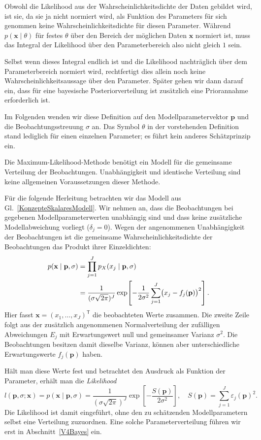 Obwohl die Likelihood aus der Wahrscheinlichkeitsdichte der Daten
gebildet wird, ist sie, da sie ja nicht normiert wird,
als Funktion des Parameters für sich genommen
keine Wahrscheinlichkeitsdichte für diesen Parameter. Während
$p(\mathbf x\mid\theta)$ für festes $\theta$ über den Bereich der
möglichen Daten $\mathbf x$ normiert ist, muss das Integral der
Likelihood über den Parameterbereich also nicht gleich $1$ sein.

Selbst wenn dieses Integral endlich ist und die Likelihood
nachträglich über dem Parameterbereich normiert wird, rechtfertigt
dies allein noch keine Wahrscheinlichkeitsaussage über den
Parameter. Später gehen wir dann darauf ein, dass für eine bayesische Posteriorverteilung ist zusätzlich eine Priorannahme erforderlich ist.

Im Folgenden wenden wir diese Definition auf den Modellparametervektor
$\mathbf p$ und die Beobachtungsstreuung $\sigma$ an. Das Symbol $\theta$
in der vorstehenden Definition stand lediglich für einen einzelnen
Parameter; es führt kein anderes Schätzprinzip ein.


Die Maximum-Likelihood-Methode benötigt ein Modell für die gemeinsame
Verteilung der Beobachtungen. Unabhängigkeit und identische Verteilung
sind keine allgemeinen Voraussetzungen dieser Methode.

Für die folgende Herleitung betrachten wir das Modell aus
Gl.~\eqref{KonzepteSkalaresModell}. Wir nehmen an, dass die Beobachtungen
bei gegebenen Modellparameterwerten unabhängig sind und dass keine
zusätzliche Modell\-ab\-weichung vorliegt ($\delta_j=0$).
Wegen der angenommenen Unabhängigkeit der Beobachtungen ist die gemeinsame
Wahrscheinlichkeitsdichte der Beobachtungen das Produkt ihrer
Einzeldichten:
\begin{align}
p(\mathbf{x}\mid\mathbf{p},\sigma)
&=\prod_{j=1}^{J}p_X(x_j\mid\mathbf{p},\sigma)\notag\\
&=\frac{1}{(\sigma\sqrt{2\pi})^J}
\exp\!\left[-\frac{1}{2\sigma^2}
\sum_{j=1}^{J}\bigl(x_j-f_j(\mathbf{p})\bigr)^2\right].
\label{Likelihood1}
\end{align}
Hier fasst $\mathbf{x}=(x_1,\dots,x_J)^\mathsf{T}$ die beobachteten Werte
zusammen. 
Die zweite Zeile folgt aus der zusätzlich angenommenen Normalverteilung
der zufälligen Abweichungen $E_j$ mit Erwartungswert null und
gemeinsamer Varianz $\sigma^2$. Die Beobachtungen besitzen damit
dieselbe Varianz, können aber unterschiedliche Erwartungswerte
$f_j(\mathbf p)$ haben.

Hält man diese Werte fest und betrachtet den Ausdruck als
Funktion der Parameter, erhält man die \textsl{Likelihood}
\begin{equation}
l(\mathbf{p},\sigma;\mathbf{x})
=p(\mathbf{x}\mid\mathbf{p},\sigma)
=\frac{1}{(\sigma\sqrt{2\pi})^J}
\exp\!\left[-\frac{S(\mathbf{p})}{2\sigma^2}\right],
\quad S(\mathbf{p})=\sum_{j=1}^{J}\varepsilon_j(\mathbf{p})^2.
\label{Likelihood2}
\end{equation}
Die Likelihood ist damit eingeführt, ohne den zu schätzenden Modellparametern
selbst eine Verteilung zuzuordnen. Eine solche Parameterverteilung
führen wir erst in Abschnitt~\ref{V4Bayes} ein.

